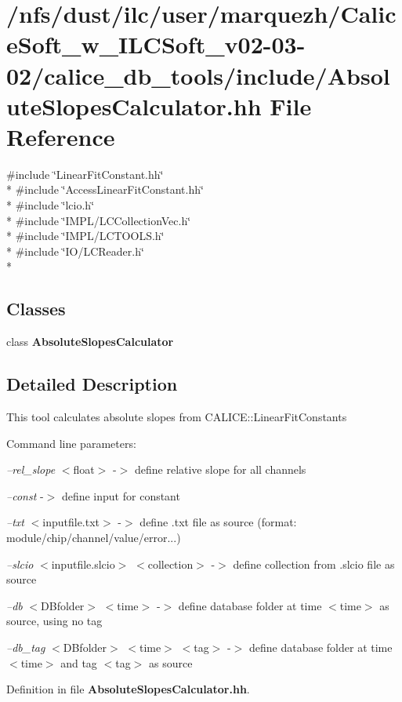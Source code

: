 \section{/nfs/dust/ilc/user/marquezh/\-Calice\-Soft\-\_\-w\-\_\-\-I\-L\-C\-Soft\-\_\-v02-\/03-\/02/calice\-\_\-db\-\_\-tools/include/\-Absolute\-Slopes\-Calculator.hh File Reference}
\label{AbsoluteSlopesCalculator_8hh}
{\ttfamily \#include \char`\"{}Linear\-Fit\-Constant.\-hh\char`\"{}}\\*
{\ttfamily \#include \char`\"{}Access\-Linear\-Fit\-Constant.\-hh\char`\"{}}\\*
{\ttfamily \#include \char`\"{}lcio.\-h\char`\"{}}\\*
{\ttfamily \#include \char`\"{}I\-M\-P\-L/\-L\-C\-Collection\-Vec.\-h\char`\"{}}\\*
{\ttfamily \#include \char`\"{}I\-M\-P\-L/\-L\-C\-T\-O\-O\-L\-S.\-h\char`\"{}}\\*
{\ttfamily \#include \char`\"{}I\-O/\-L\-C\-Reader.\-h\char`\"{}}\\*
\subsection*{Classes}
\begin{DoxyCompactItemize}
\item 
class {\bf Absolute\-Slopes\-Calculator}
\end{DoxyCompactItemize}


\subsection{Detailed Description}
This tool calculates absolute slopes from C\-A\-L\-I\-C\-E\-::\-Linear\-Fit\-Constants

Command line parameters\-: \par
 {\itshape --rel\-\_\-slope} $<$float$>$ -\/$>$ define relative slope for all channels\par
\par
 {\itshape --const} -\/$>$ define input for constant \par
\par
 {\itshape --txt} $<$inputfile.\-txt$>$ -\/$>$ define .txt file as source (format\-: module/chip/channel/value/error...) \par
 {\itshape --slcio} $<$inputfile.\-slcio$>$ $<$collection$>$ -\/$>$ define collection from .slcio file as source \par
 {\itshape --db} $<$D\-Bfolder$>$ $<$time$>$ -\/$>$ define database folder at time $<$time$>$ as source, using no tag \par
 {\itshape --db\-\_\-tag} $<$D\-Bfolder$>$ $<$time$>$ $<$tag$>$ -\/$>$ define database folder at time $<$time$>$ and tag $<$tag$>$ as source \par


Definition in file {\bf Absolute\-Slopes\-Calculator.\-hh}.

